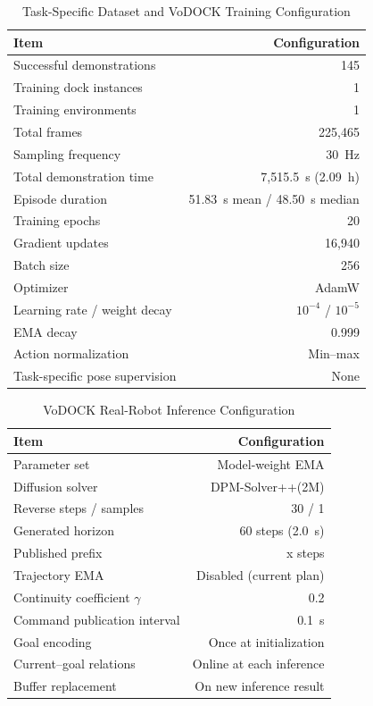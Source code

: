 \documentclass[letterpaper, 10 pt, conference]{IEEEtran}  %
\begin{document}
\begin{table}[!t]
\caption{Task-Specific Dataset and VoDOCK Training Configuration}
\label{tab:training_configuration}
\centering
\footnotesize
\renewcommand{\arraystretch}{1.05}
\begin{tabular*}{\columnwidth}{@{\extracolsep{\fill}}lr@{}}
\toprule
Item & Configuration \\
\midrule
Successful demonstrations & 145 \\
Training dock instances & 1 \\
Training environments & 1 \\
Total frames & 225,465 \\
Sampling frequency & 30~Hz \\
Total demonstration time & 7,515.5~s (2.09~h) \\
Episode duration & 51.83~s mean / 48.50~s median \\
Training epochs & 20 \\
Gradient updates & 16,940 \\
Batch size & 256 \\
Optimizer & AdamW \\
Learning rate / weight decay & $10^{-4}$ / $10^{-5}$ \\
EMA decay & 0.999 \\
Action normalization & Min--max \\
Task-specific pose supervision & None \\
\bottomrule
\end{tabular*}
\end{table}

\begin{table}[!t]
\caption{VoDOCK Real-Robot Inference Configuration}
\label{tab:inference_configuration}
\centering
\footnotesize
\renewcommand{\arraystretch}{1.05}
\begin{tabular*}{\columnwidth}{@{\extracolsep{\fill}}lr@{}}
\toprule
Item & Configuration \\
\midrule
Parameter set & Model-weight EMA \\
Diffusion solver & DPM-Solver++(2M) \\
Reverse steps / samples & 30 / 1 \\
Generated horizon & 60 steps (2.0~s) \\
Published prefix & x steps  \\
Trajectory EMA & Disabled (current plan) \\
Continuity coefficient $\gamma$ & 0.2 \\
Command publication interval & 0.1~s \\
Goal encoding & Once at initialization \\
Current--goal relations & Online at each inference \\
Buffer replacement & On new inference result \\
\bottomrule
\end{tabular*}
\end{table}
\end{document}
